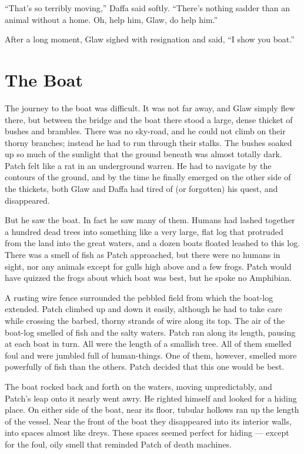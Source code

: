 \documentclass[ebook,oneside,openany,17pt]{memoir}
\newenvironment{tolerant}[1]{%
  \par\tolerance=#1\relax
}{%
  \par
}
\renewcommand{\thechapter}{\Roman{chapter}}
\newcounter{sections}
\newcommand{\sections}[1]{%
  \section*{#1}
  \addtocounter{sections}{1}%
  \pdfbookmark[1]{#1}{section.\thechapter.\thesections}}
\begin{document}
\begin{tolerant}{2000}
“That’s so terribly moving,” Daffa said softly. “There’s nothing
sadder than an animal without a home. Oh, help him, Glaw, do help
him.”
\end{tolerant}

After a long moment, Glaw sighed with resignation and said, “I show
you boat.”


\sections{The Boat}

The journey to the boat was difficult. It was not far away, and Glaw
simply flew there, but between the bridge and the boat there stood a
large, dense thicket of bushes and brambles. There was no sky-road,
and he could not climb on their thorny branches; instead he had to run
through their stalks. The bushes soaked up so much of the sunlight
that the ground beneath was almost totally dark. Patch felt like a rat
in an underground warren. He had to navigate by the contours of the
ground, and by the time he finally emerged on the other side of the
thickets, both Glaw and Daffa had tired of (or forgotten) his quest,
and disappeared.

But he saw the boat. In fact he saw many of them. Humans had lashed
together a hundred dead trees into something like a very large, flat
log that protruded from the land into the great waters, and a dozen
boats floated leashed to this log. There was a smell of fish as Patch
approached, but there were no humans in sight, nor any animals except
for gulls high above and a few frogs. Patch would have quizzed the
frogs about which boat was best, but he spoke no Amphibian.

\begin{tolerant}{1000}
A rusting wire fence surrounded the pebbled field from which the
boat-log extended. Patch climb\-ed up and down it easily, although he
had to take care while crossing the barbed, thorny strands of wire
along its top. The air of the boat-log smelled of fish and the salty
waters. Patch ran along its length, pausing at each boat in turn. All
were the length of a smallish tree. All of them smelled foul and were
jumbled full of human-things. One of them, however, smelled more
powerfully of fish than the others. Patch decided that this one would
be best.
\end{tolerant}

The boat rocked back and forth on the waters, moving unpredictably,
and Patch’s leap onto it nearly went awry. He righted himself and
looked for a hiding place. On either side of the boat, near its floor,
tubular hollows ran up the length of the vessel. Near the front of the
boat they disappeared into its interior walls, into spaces almost like
dreys. These spaces seemed perfect for hiding — except for the foul,
oily smell that reminded Patch of death machines.
\end{document}
